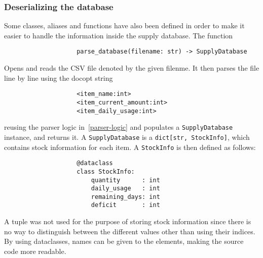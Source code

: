 \documentclass{article}
\begin{document}
			\subsubsection{Deserializing the database}
				Some classes, aliases and functions have also been defined in order to make it easier to handle
				the information inside the supply database. The function

				\begin{verbatim}
					parse_database(filename: str) -> SupplyDatabase
				\end{verbatim}

				Opens and reads the CSV file denoted by the given filenme. It then parses the file line by line using
				the docopt string

				\begin{verbatim}
					<item_name:int>
					<item_current_amount:int>
					<item_daily_usage:int>
				\end{verbatim}

				reusing the parser logic in~\ref{parser-logic} and populates a \verb|SupplyDatabase| instance, and
				returns it. A \verb|SupplyDatabase| is a \verb|dict[str, StockInfo]|, which contains stock information
				for each item. A \verb|StockInfo| is then defined as follows:

				\begin{verbatim}
					@dataclass
					class StockInfo:
						quantity      : int
						daily_usage   : int
						remaining_days: int
						deficit       : int
				\end{verbatim}

				A tuple was not used for the purpose of storing stock information since there is no way to
				distinguish between the different values other than using their indices. By using dataclasses,
				names can be given to the elements, making the source code more readable.
\end{document}
